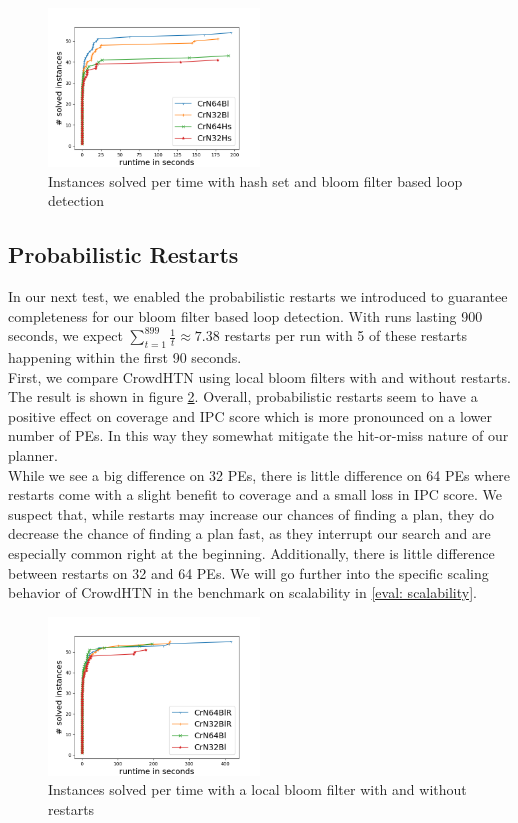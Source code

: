 \begin{figure}[!hbp]
	\caption{Instances solved per time with hash set and bloom filter based loop detection}
	\label{figure: eval loop detection}
	
		\centering
		\includegraphics[width=0.5\textwidth]{images/final/loop_detection}
\end{figure}

\subsection{Probabilistic Restarts}
\label{eval: restarts}
In our next test, we enabled the probabilistic restarts we introduced to guarantee completeness for our bloom filter based loop detection. With runs lasting 900 seconds, we expect $\sum_{t=1}^{899} \frac{1}{t} \approx 7.38$ restarts per run with 5 of these restarts happening within the first 90 seconds. \\
First, we compare CrowdHTN using local bloom filters with and without restarts. The result is shown in figure \ref{figure: restarts}. Overall, probabilistic restarts seem to have a positive effect on coverage and IPC score which is more pronounced on a lower number of PEs. In this way they somewhat mitigate the hit-or-miss nature of our planner. \\
While we see a big difference on 32 PEs, there is little difference on 64 PEs where restarts come with a slight benefit to coverage and a small loss in IPC score. We suspect that, while restarts may increase our chances of finding a plan, they do decrease the chance of finding a plan fast, as they interrupt our search and are especially common right at the beginning. Additionally, there is little difference between restarts on 32 and 64 PEs. We will go further into the specific scaling behavior of CrowdHTN in the benchmark on scalability in \ref{eval: scalability}. \\
\begin{figure}[!hbp]
	\caption{Instances solved per time with a local bloom filter with and without restarts}
	\label{figure: restarts}
	\centering
	\includegraphics[width=0.5\textwidth]{images/final/restarts}
\end{figure}

